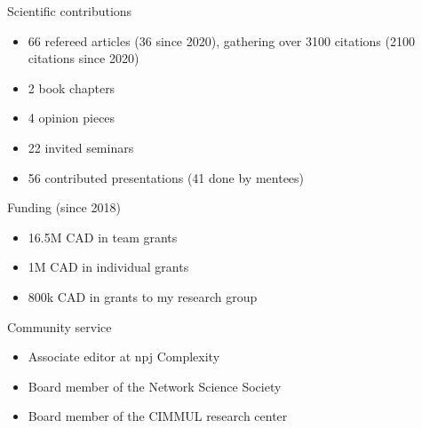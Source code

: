 \documentclass[10pt]{article}
\begin{document}
\vspace*{0.25\baselineskip}
\begin{minipage}[t]{0.56\textwidth}
  {\large\color{monbleu}Scientific contributions}
  \begin{itemize}
    \item 66 refereed articles (36 since 2020), gathering over 3100 citations (2100 citations since 2020)
    \item 2 book chapters
    \item 4 opinion pieces
    \item 22 invited seminars
    \item 56 contributed presentations (41 done by mentees)
  \end{itemize}
\end{minipage}
\hfill
\begin{minipage}[t]{0.42\textwidth}
  {\large\color{monbleu}Funding (since 2018)}
  \begin{itemize}
    \item 16.5M CAD in team grants
    \item 1M CAD in individual grants
    \item 800k CAD in grants to my research group
  \end{itemize}
  {\large\color{monbleu}Community service}
  \begin{itemize}
    \item Associate editor at npj Complexity
    \item Board member of the Network Science Society
    \item Board member of the CIMMUL research center
  \end{itemize}
\end{minipage}
\end{document}
